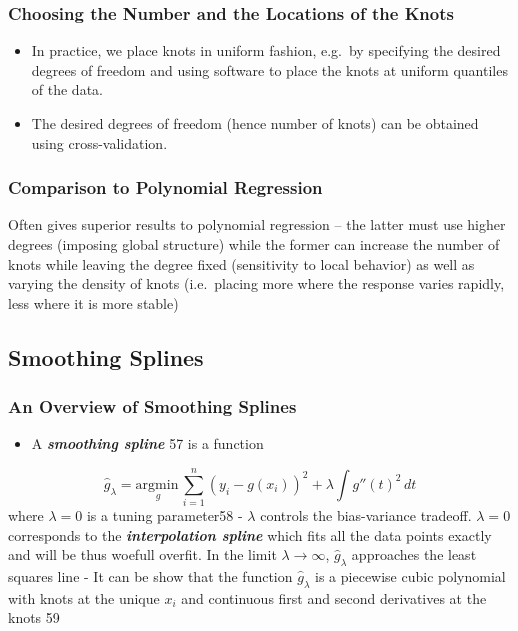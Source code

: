 \documentclass[11pt]{article}
\providecommand{\tightlist}{%
      \setlength{\itemsep}{0pt}\setlength{\parskip}{0pt}}
\begin{document}
    \hypertarget{choosing-the-number-and-the-locations-of-the-knots}{%
\subsubsection{Choosing the Number and the Locations of the
Knots}\label{choosing-the-number-and-the-locations-of-the-knots}}

    \begin{itemize}
\tightlist
\item
  In practice, we place knots in uniform fashion, e.g.~by specifying the
  desired degrees of freedom and using software to place the knots at
  uniform quantiles of the data.
\item
  The desired degrees of freedom (hence number of knots) can be obtained
  using cross-validation.
\end{itemize}

    \hypertarget{comparison-to-polynomial-regression}{%
\subsubsection{Comparison to Polynomial
Regression}\label{comparison-to-polynomial-regression}}

    Often gives superior results to polynomial regression -- the latter must
use higher degrees (imposing global structure) while the former can
increase the number of knots while leaving the degree fixed (sensitivity
to local behavior) as well as varying the density of knots (i.e.~placing
more where the response varies rapidly, less where it is more stable)

    \hypertarget{smoothing-splines}{%
\subsection{Smoothing Splines}\label{smoothing-splines}}

    \hypertarget{an-overview-of-smoothing-splines}{%
\subsubsection{An Overview of Smoothing
Splines}\label{an-overview-of-smoothing-splines}}

    \begin{itemize}
\tightlist
\item
  A \textbf{\emph{smoothing spline}} 57 is a function
\end{itemize}

\[\hat{g}_\lambda = \underset{g}{\text{argmin}\,}\sum_{i=1}^n(y_i - g(x_i))^2 + \lambda \int g''(t)^2\,dt\]
where \(\lambda = 0\) is a tuning parameter58 - \(\lambda\) controls the
bias-variance tradeoff. \(\lambda = 0\) corresponds to the
\textbf{\emph{interpolation spline}} which fits all the data points
exactly and will be thus woefull overfit. In the limit
\(\lambda \rightarrow \infty\), \(\hat{g}_\lambda\) approaches the least
squares line - It can be show that the function \(\hat{g}_\lambda\) is a
piecewise cubic polynomial with knots at the unique \(x_i\) and
continuous first and second derivatives at the knots 59
\end{document}
